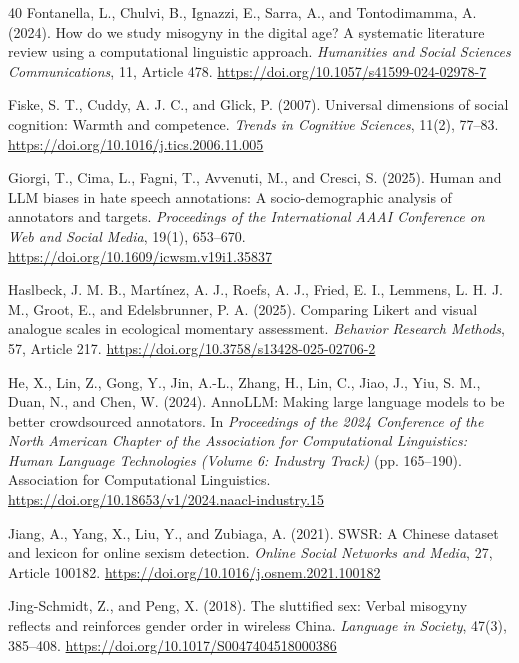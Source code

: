 \documentclass[a4paper,fleqn,review]{cas-sc}
\begin{document}
\begin{thebibliography}{40}
Fontanella, L., Chulvi, B., Ignazzi, E., Sarra, A., and Tontodimamma, A. (2024).
How do we study misogyny in the digital age? A systematic literature review using a computational linguistic approach.
\emph{Humanities and Social Sciences Communications}, 11, Article 478.
\url{https://doi.org/10.1057/s41599-024-02978-7}

Fiske, S. T., Cuddy, A. J. C., and Glick, P. (2007).
Universal dimensions of social cognition: Warmth and competence.
\emph{Trends in Cognitive Sciences}, 11(2), 77--83.
\url{https://doi.org/10.1016/j.tics.2006.11.005}

Giorgi, T., Cima, L., Fagni, T., Avvenuti, M., and Cresci, S. (2025).
Human and LLM biases in hate speech annotations: A socio-demographic analysis of annotators and targets.
\emph{Proceedings of the International AAAI Conference on Web and Social Media}, 19(1), 653--670.
\url{https://doi.org/10.1609/icwsm.v19i1.35837}

Haslbeck, J. M. B., Mart\'inez, A. J., Roefs, A. J., Fried, E. I., Lemmens, L. H. J. M., Groot, E., and Edelsbrunner, P. A. (2025).
Comparing Likert and visual analogue scales in ecological momentary assessment.
\emph{Behavior Research Methods}, 57, Article 217.
\url{https://doi.org/10.3758/s13428-025-02706-2}

He, X., Lin, Z., Gong, Y., Jin, A.-L., Zhang, H., Lin, C., Jiao, J., Yiu, S. M., Duan, N., and Chen, W. (2024).
AnnoLLM: Making large language models to be better crowdsourced annotators.
In \emph{Proceedings of the 2024 Conference of the North American Chapter of the Association for Computational Linguistics: Human Language Technologies (Volume 6: Industry Track)} (pp. 165--190).
Association for Computational Linguistics.
\url{https://doi.org/10.18653/v1/2024.naacl-industry.15}

Jiang, A., Yang, X., Liu, Y., and Zubiaga, A. (2021).
SWSR: A Chinese dataset and lexicon for online sexism detection.
\emph{Online Social Networks and Media}, 27, Article 100182.
\url{https://doi.org/10.1016/j.osnem.2021.100182}

Jing-Schmidt, Z., and Peng, X. (2018).
The sluttified sex: Verbal misogyny reflects and reinforces gender order in wireless China.
\emph{Language in Society}, 47(3), 385--408.
\url{https://doi.org/10.1017/S0047404518000386}


\end{thebibliography}
\end{document}
